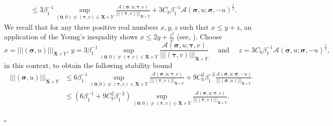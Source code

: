 \documentclass[11pt, reqno, a4paper, twoside]{article}
\newcommand*\tnorm[1]{|\!|\!| #1 |\!|\!|}
\newcommand\bsigma{\boldsymbol{\sigma}}
\newcommand\bzero{\boldsymbol{0}}
\newcommand\btau{\boldsymbol{\tau}}
\newcommand{\bX}{\mathbf{X}}
\newenvironment{proof}{\noindent{\it Proof.}}{\hfill$\square$}
\numberwithin{equation}{section}
\numberwithin{remark}{section}
\numberwithin{figure}{section}
\numberwithin{table}{section}
\begin{document}
\begin{proof}
\begin{align}
&\leq 3\beta_1^{-1}\sup_{(\bzero,0)\neq(\btau,v)\in{\bX\times Y}}\frac{\mathcal{A}(\bsigma,u;\btau,v)}{\tnorm{(\btau,v)}_{\bX\times Y}}+3C_b\beta_1^{-1}\mathcal{A}(\bsigma,u;\bsigma,-u)^{\frac12}.
\end{align}
We recall that for any three positive real numbers \(x, y, z\) such that \(x\leq y+z\), an application of the Young's inequality shows \(x\leq2y+\frac{z^2}{x}\) (see, \cite[Equation~3.4]{braess1996stability}). Choose \[x=\tnorm{(\bsigma,u)}_{\bX\times Y},\, y = 3\beta_1^{-1}\sup_{(\bzero,0)\neq(\btau,v)\in{\bX\times Y}}\frac{\mathcal{A}(\bsigma,u;\btau,v)}{\tnorm{(\btau,v)}_{\bX\times Y}} \quad \text{ and }\quad  z= 3C_b\beta_1^{-1}\mathcal{A}(\bsigma,u;\bsigma,-u)^{\frac12},\] in this context, %
to obtain the following stability bound 
\begin{align*}
\tnorm{(\bsigma,u)}_{\bX\times Y}&\leq 6\beta_1^{-1}\sup_{(\bzero,0)\neq(\btau,v)\in{\bX\times Y}}\frac{\mathcal{A}(\bsigma,u;\btau,v)}{\tnorm{(\btau,v)}_{\bX\times Y}}+9C_b^2\beta_1^{-2}\frac{\mathcal{A}(\bsigma,u;\bsigma,-u)}{\tnorm{(\bsigma,u)}_{\bX\times Y}}\\
&\leq(6\beta_1^{-1}+9C_b^2\beta_1^{-2})\sup_{(\bzero,0)\neq(\btau,v)\in{\bX\times Y}}\frac{\mathcal{A}(\bsigma,u;\btau,v)}{\tnorm{(\btau,v)}_{\bX\times Y}}.
\end{align*}


\end{proof}
\end{document}
